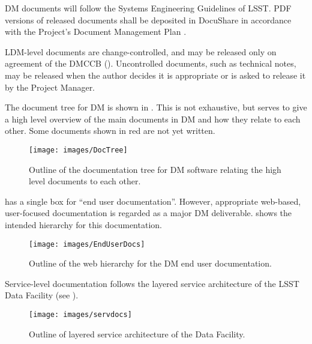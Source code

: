 DM documents will follow the Systems Engineering Guidelines of LSST. PDF versions of released documents shall be deposited in DocuShare in accordance with the Project's Document Management Plan .

LDM-level documents are change-controlled, and may be released only on agreement of the DMCCB (). Uncontrolled documents, such as technical notes, may be released when the author decides it is appropriate or is asked to release it by the Project Manager.

The document tree for DM is shown in . This is not exhaustive, but serves to give a high level overview of the main documents in DM and how they relate to each other. Some documents shown in red are not yet written.

\begin{figure}
\begin{center}
 \texttt{[image: images/DocTree]}
\caption{Outline of the documentation tree for DM software relating the high level documents to each other. \label{fig:doctree}}
\end{center}
\end{figure}

 has a single box for ``end user documentation''. However, appropriate web-based, user-focused documentation is regarded as a major DM deliverable.  shows the intended hierarchy for this documentation.

\begin{figure}
\begin{center}
 \texttt{[image: images/EndUserDocs]}
\caption{Outline of the web hierarchy for the DM end user documentation. \label{fig:eudoc}}
\end{center}
\end{figure}



Service-level documentation follows the layered service architecture of the LSST Data Facility (see ).

\begin{figure}
\begin{center}
 \texttt{[image: images/servdocs]}
\caption{Outline of layered service architecture of the Data Facility. \label{fig:servdoc}}
\end{center}
\end{figure}

